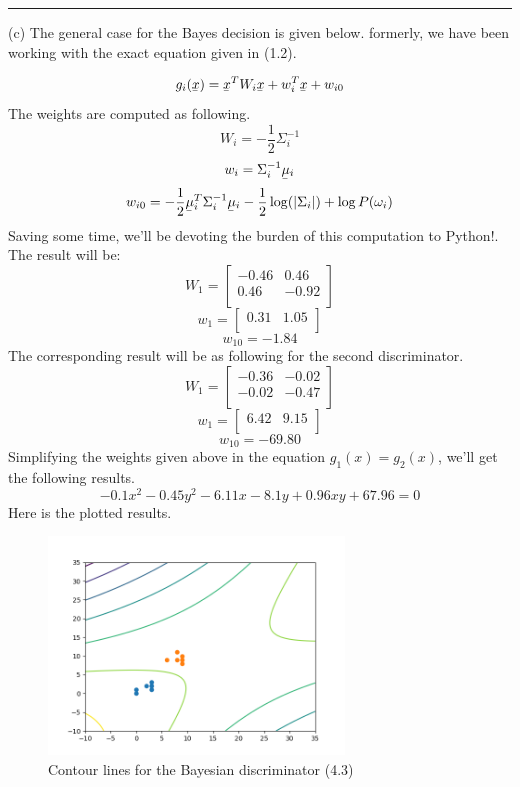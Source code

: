 \documentclass[12pt]{article}
\numberwithin{equation}{section}
\numberwithin{table}{section}
\numberwithin{figure}{section}
\begin{document}
\noindent\rule{\textwidth}{.5pt}
(c) The general case for the Bayes decision is given below. formerly, we have been working with the exact equation given in (1.2).

\begin{equation}
	g_i(\underaccent{\bar}{x}) = \underaccent{\bar}{x}^TW_i\underaccent{\bar}{x} + w_i^T\underaccent{\bar}{x} + w_{i0}
\end{equation}
The weights are computed as following.
$$
	W_i = -\frac{1}{2}\Sigma_i^{-1}
$$
$$
	w_i = \Sigma_i^{-1}\underaccent{\bar}{\mu}_i
$$
$$
	w_{i0} = -\frac{1}{2}\underaccent{\bar}{\mu}_i^T\Sigma_i^{-1}\underaccent{\bar}{\mu}_i - \frac{1}{2}\log(|\Sigma_i|) + \log P(\omega_i)
$$
Saving some time, we'll be devoting the burden of this computation to Python!. The result will be:
$$
	W_1 =  \begin{bmatrix}
	-0.46 & 0.46\\
	0.46 & -0.92\\
	\end{bmatrix}
$$
$$
	w_1 = \begin{bmatrix}
	0.31 & 1.05\\
	\end{bmatrix}
$$
$$
	w_{10} = -1.84
$$
The corresponding result will be as following for the second discriminator.
$$
	W_1 =  \begin{bmatrix}
	-0.36 & -0.02\\
	-0.02 & -0.47\\
	\end{bmatrix}
$$
$$
	w_1 = \begin{bmatrix}
	6.42 & 9.15\\
	\end{bmatrix}
$$
$$
	w_{10} = -69.80
$$
Simplifying the weights given above in the equation $g_1(x) = g_2(x)$, we'll get the following results.
\begin{equation}
	-0.1x^2 - 0.45y^2 - 6.11x - 8.1y + 0.96xy + 67.96= 0
\end{equation}
Here is the plotted results.
\begin{figure}[!h]\centering
	\includegraphics[width=0.7\textwidth]{4_3.png}
	\caption{Contour lines for the Bayesian discriminator (4.3)}
	\label{pl1}
\end{figure}
	
\end{document}
